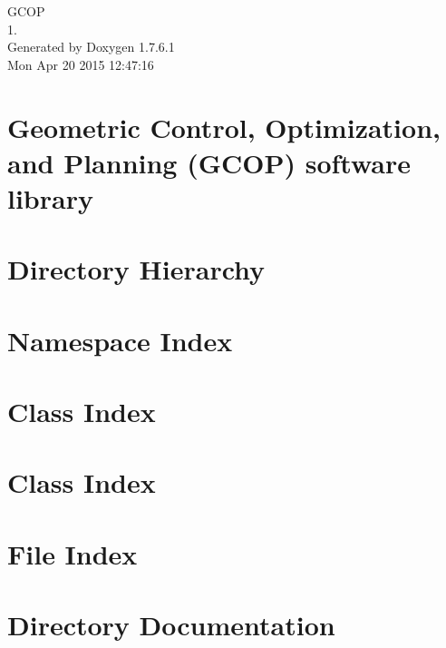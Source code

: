 \documentclass[a4paper]{book}
\begin{document}
\begin{titlepage}
\vspace*{7cm}
\begin{center}
{\Large \-G\-C\-O\-P \\[1ex]\large 1. }\\
\vspace*{1cm}
{\large \-Generated by Doxygen 1.7.6.1}\\
\vspace*{0.5cm}
{\small Mon Apr 20 2015 12:47:16}\\
\end{center}
\end{titlepage}
\clearemptydoublepage
{}
\tableofcontents
\clearemptydoublepage
{}
\chapter{\-Geometric \-Control, \-Optimization, and \-Planning (\-G\-C\-O\-P) software library}
\label{index}
\chapter{\-Directory \-Hierarchy}

\chapter{\-Namespace \-Index}

\chapter{\-Class \-Index}

\chapter{\-Class \-Index}

\chapter{\-File \-Index}

\chapter{\-Directory \-Documentation}













\end{document}
